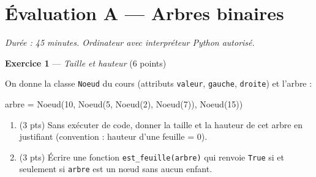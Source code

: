 \section*{Évaluation A --- Arbres binaires}
\textit{Durée : 45 minutes. Ordinateur avec interpréteur Python autorisé.}


\bigskip

\textbf{Exercice 1} --- \textit{Taille et hauteur} \hfill (6 points)

On donne la classe \lstinline{Noeud} du cours (attributs \lstinline{valeur}, \lstinline{gauche}, \lstinline{droite}) et l'arbre :
\begin{python}
arbre = Noeud(10, Noeud(5, Noeud(2), Noeud(7)), Noeud(15))
\end{python}
\begin{enumerate}
  \item (3 pts) Sans exécuter de code, donner la taille et la hauteur de cet arbre en justifiant (convention : hauteur d'une feuille = $0$).
  \item (3 pts) Écrire une fonction \lstinline{est_feuille(arbre)} qui renvoie \lstinline{True} si et seulement si \lstinline{arbre} est un nœud sans aucun enfant.
\end{enumerate}


\bigskip

